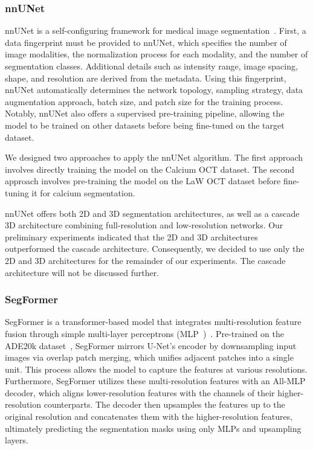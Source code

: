 \documentclass[a4paper,11pt,oneside]{report}
\begin{document}
\subsubsection{nnUNet}\label{sec:design:nnunet}
nnUNet is a self-configuring framework for medical image segmentation~\cite{Isensee2020}. First, a data fingerprint must be provided to nnUNet, which specifies the number of image modalities, the normalization process for each modality, and the number of segmentation classes. Additional details such as intensity range, image spacing, shape, and resolution are derived from the metadata. Using this fingerprint, nnUNet automatically determines the network topology, sampling strategy, data augmentation approach, batch size, and patch size for the training process. Notably, nnUNet also offers a supervised pre-training pipeline, allowing the model to be trained on other datasets before being fine-tuned on the target dataset.

We designed two approaches to apply the nnUNet algorithm. The first approach involves directly training the model on the Calcium OCT dataset. The second approach involves pre-training the model on the LaW OCT dataset before fine-tuning it for calcium segmentation. 

nnUNet offers both 2D and 3D segmentation architectures, as well as a cascade 3D architecture combining full-resolution and low-resolution networks. Our preliminary experiments indicated that the 2D and 3D architectures outperformed the cascade architecture. Consequently, we decided to use only the 2D and 3D architectures for the remainder of our experiments. The cascade architecture will not be discussed further.

\subsubsection{SegFormer}
SegFormer is a transformer-based model that integrates multi-resolution feature fusion through simple multi-layer perceptrons (MLP~\cite{Rumelhart1986})~\cite{Xie2021SegFormer}. Pre-trained on the ADE20k dataset~\cite{Zhou2018}, SegFormer mirrors U-Net's encoder by downsampling input images via overlap patch merging, which unifies adjacent patches into a single unit. This process allows the model to capture the features at various resolutions. Furthermore, SegFormer utilizes these multi-resolution features with an All-MLP decoder, which aligns lower-resolution features with the channels of their higher-resolution counterparts. The decoder then upsamples the features up to the original resolution and concatenates them with the higher-resolution features, ultimately predicting the segmentation masks using only MLPs and upsampling layers. 
\end{document}
